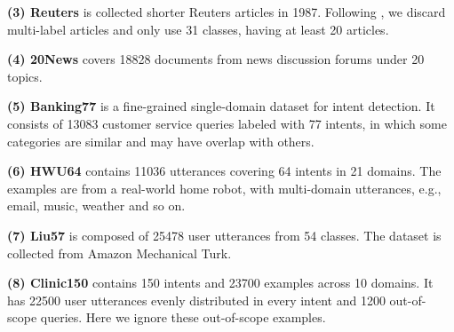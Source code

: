 \documentclass[letterpaper]{article} %
\begin{document}
\textbf{(3) Reuters} \cite{iclr/BaoWCB20} is collected shorter Reuters articles in 1987. Following \cite{iclr/BaoWCB20}, we discard multi-label articles and only use 31 classes, having at least 20  articles.

\textbf{(4) 20News} \cite{20news} covers 18828 documents from news discussion forums under 20 topics.

\textbf{(5)  Banking77} \cite{banking} is a fine-grained single-domain dataset for intent detection. It consists of 13083 customer service queries labeled with 77 intents, in which some categories are similar and may have overlap with others.

\textbf{(6) HWU64} \cite{hwu} contains 11036 utterances covering 64 intents in 21 domains. The examples are from a real-world home robot, with multi-domain utterances, e.g., email, music, weather and so on.

\textbf{(7) Liu57} \cite{hwu} is composed of 25478 user utterances from 54 classes. The dataset is collected from Amazon Mechanical Turk.

\textbf{(8) Clinic150} \cite{oos} contains 150 intents and 23700 examples across 10 domains. It has 22500 user utterances evenly distributed in every intent and 1200 out-of-scope queries. Here we ignore these out-of-scope examples.
\end{document}
